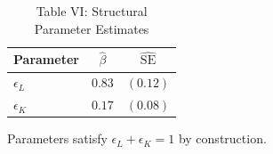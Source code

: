 \documentclass{article}
\begin{document}
\begin{table}[htbp]
\centering
\caption{Table VI: Structural Parameter Estimates}
\begin{threeparttable}
\begin{tabular}{lcc}
\toprule
Parameter & $\hat{\beta}$ & $\widehat{\mathrm{SE}}$ \\
\midrule
$\epsilon_L$ & $0.83$ & $(0.12)$ \\
$\epsilon_K$ & $0.17$ & $(0.08)$ \\
\bottomrule
\end{tabular}
\begin{tablenotes}[flushleft]
\item Parameters satisfy $\epsilon_L + \epsilon_K = 1$ by construction.
\end{tablenotes}
\end{threeparttable}
\end{table}
\end{document}
